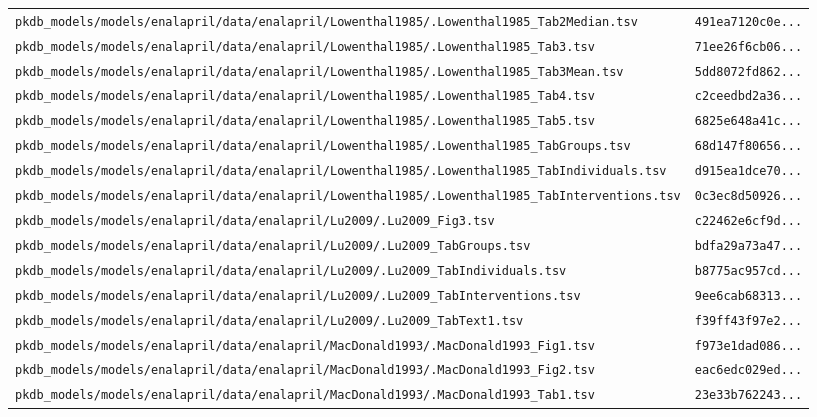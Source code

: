\begin{longtable}{ll}
\texttt{pkdb\_models/models/enalapril/data/enalapril/Lowenthal1985/.Lowenthal1985\_Tab2Median.tsv} & \texttt{491ea7120c0e...} \\
\texttt{pkdb\_models/models/enalapril/data/enalapril/Lowenthal1985/.Lowenthal1985\_Tab3.tsv} & \texttt{71ee26f6cb06...} \\
\texttt{pkdb\_models/models/enalapril/data/enalapril/Lowenthal1985/.Lowenthal1985\_Tab3Mean.tsv} & \texttt{5dd8072fd862...} \\
\texttt{pkdb\_models/models/enalapril/data/enalapril/Lowenthal1985/.Lowenthal1985\_Tab4.tsv} & \texttt{c2ceedbd2a36...} \\
\texttt{pkdb\_models/models/enalapril/data/enalapril/Lowenthal1985/.Lowenthal1985\_Tab5.tsv} & \texttt{6825e648a41c...} \\
\texttt{pkdb\_models/models/enalapril/data/enalapril/Lowenthal1985/.Lowenthal1985\_TabGroups.tsv} & \texttt{68d147f80656...} \\
\texttt{pkdb\_models/models/enalapril/data/enalapril/Lowenthal1985/.Lowenthal1985\_TabIndividuals.tsv} & \texttt{d915ea1dce70...} \\
\texttt{pkdb\_models/models/enalapril/data/enalapril/Lowenthal1985/.Lowenthal1985\_TabInterventions.tsv} & \texttt{0c3ec8d50926...} \\
\texttt{pkdb\_models/models/enalapril/data/enalapril/Lu2009/.Lu2009\_Fig3.tsv} & \texttt{c22462e6cf9d...} \\
\texttt{pkdb\_models/models/enalapril/data/enalapril/Lu2009/.Lu2009\_TabGroups.tsv} & \texttt{bdfa29a73a47...} \\
\texttt{pkdb\_models/models/enalapril/data/enalapril/Lu2009/.Lu2009\_TabIndividuals.tsv} & \texttt{b8775ac957cd...} \\
\texttt{pkdb\_models/models/enalapril/data/enalapril/Lu2009/.Lu2009\_TabInterventions.tsv} & \texttt{9ee6cab68313...} \\
\texttt{pkdb\_models/models/enalapril/data/enalapril/Lu2009/.Lu2009\_TabText1.tsv} & \texttt{f39ff43f97e2...} \\
\texttt{pkdb\_models/models/enalapril/data/enalapril/MacDonald1993/.MacDonald1993\_Fig1.tsv} & \texttt{f973e1dad086...} \\
\texttt{pkdb\_models/models/enalapril/data/enalapril/MacDonald1993/.MacDonald1993\_Fig2.tsv} & \texttt{eac6edc029ed...} \\
\texttt{pkdb\_models/models/enalapril/data/enalapril/MacDonald1993/.MacDonald1993\_Tab1.tsv} & \texttt{23e33b762243...} \\

\end{longtable}
